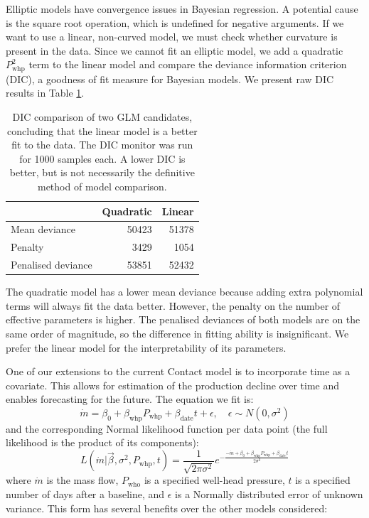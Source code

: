 \documentclass[a4paper, 12pt]{article}
\begin{document}
Elliptic models have convergence issues in Bayesian regression. A potential cause is the square root operation, which is undefined for negative arguments. If we want to use a linear, non-curved model, we must check whether curvature is present in the data. Since we cannot fit an elliptic model, we add a quadratic $P_\text{whp}^2$ term to the linear model and compare the deviance information criterion (DIC), a goodness of fit measure for Bayesian models. We present raw DIC results in Table \ref{tab:curvature}.

\begin{table}
\centering
\begin{tabular}{lrr}
  \hline
& Quadratic & Linear \\ 
  \hline
Mean deviance & 50423 & 51378 \\
Penalty & 3429 & 1054 \\
Penalised deviance & 53851 & 52432\\
   \hline
\end{tabular}
\caption{DIC comparison of two GLM candidates, concluding that the linear model is a better fit to the data. The DIC monitor was run for 1000 samples each. A lower DIC is better, but is not necessarily the definitive method of model comparison.} 
\label{tab:curvature}
\end{table}

The quadratic model has a lower mean deviance because adding extra polynomial terms will always fit the data better. However, the penalty on the number of effective parameters is higher. The penalised deviances of both models are on the same order of magnitude, so the difference in fitting ability is insignificant. We prefer the linear model for the interpretability of its parameters.

One of our extensions to the current Contact model is to incorporate time as a covariate. This allows for estimation of the production decline over time and enables forecasting for the future. The equation we fit is:
\begin{equation} \label{eq:linreg}
\dot{m} = \beta_0 + \beta_\text{whp}P_\text{whp} + \beta_\text{date}t + \epsilon,\quad \epsilon\sim N(0, \sigma^2)
\end{equation}
and the corresponding Normal likelihood function per data point (the full likelihood is the product of its components):
\begin{equation}
L\left( \dot{m} | \vec{\beta},\sigma^2,P_\text{whp},t \right) = \frac{1}{\sqrt{2\pi\sigma^2}} e^{-\frac{-\dot{m} + \beta_0 + \beta_\text{whp}P_\text{whp} + \beta_\text{date}t}{2\sigma^2}}
\end{equation}
where $\dot{m}$ is the mass flow, $P_\text{who}$ is a specified well-head pressure, $t$ is a specified number of days after a baseline, and $\epsilon$ is a Normally distributed error of unknown variance. This form has several benefits over the other models considered:
\end{document}
